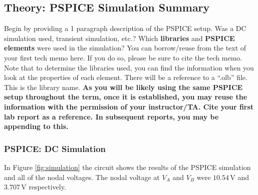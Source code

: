 \documentclass[11pt]{article}
\begin{document}
\subsection{Theory: PSPICE Simulation Summary}
Begin by providing a 1 paragraph description of the PSPICE setup. Was a DC simulation used, transient simulation, etc.?  Which \textbf{libraries} and \textbf{PSPICE elements} were used in the simulation? You can borrow/reuse from the text of your first tech memo here.  If you do so, please be sure to cite the tech memo.
Note that to determine the libraries used, you can find the information when you look at the properties of each element.  There will be a reference to a ``.olb'' file.  This is the library name. \textbf{As you will be likely using the same PSPICE setup throughout the term, once it is established, you may reuse the information with the permission of your instructor/TA. Cite your first lab report as a reference. In subsequent reports, you may be appending to this.} %
 
\subsubsection{PSPICE: DC Simulation }


In Figure \ref{fig:simulation} the circuit shows the results of the PSPICE simulation and all of the nodal voltages. The nodal voltage at $V_A$ and $V_B$ were $10.54\,\si\volt$ and $3.707\,\si\volt$ respectively.  

%
\end{document}
